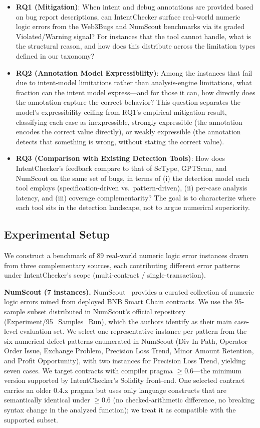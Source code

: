 \documentclass[pdflatex,sn-basic]{sn-jnl}%
\theoremstyle{thmstyleone}%
\theoremstyle{thmstyletwo}%
\theoremstyle{thmstylethree}%
\begin{document}
\begin{itemize}
    \item \textbf{RQ1 (Mitigation)}: When intent and debug annotations are provided based on bug report descriptions, can IntentChecker surface real-world numeric logic errors from the Web3Bugs and NumScout benchmarks via its graded Violated/Warning signal? For instances that the tool cannot handle, what is the structural reason, and how does this distribute across the limitation types defined in our taxonomy?
    \item \textbf{RQ2 (Annotation Model Expressibility)}: Among the instances that fail due to intent-model limitations rather than analysis-engine limitations, what fraction can the intent model express---and for those it can, how directly does the annotation capture the correct behavior? This question separates the model's expressibility ceiling from RQ1's empirical mitigation result, classifying each case as inexpressible, strongly expressible (the annotation encodes the correct value directly), or weakly expressible (the annotation detects that something is wrong, without stating the correct value).
    \item \textbf{RQ3 (Comparison with Existing Detection Tools)}: How does IntentChecker's feedback compare to that of ScType, GPTScan, and NumScout on the same set of bugs, in terms of (i) the detection model each tool employs (specification-driven vs.\ pattern-driven), (ii) per-case analysis latency, and (iii) coverage complementarity? The goal is to characterize where each tool sits in the detection landscape, not to argue numerical superiority.
\end{itemize}

\subsection{Experimental Setup}\label{sec:setup}

We construct a benchmark of 89 real-world numeric logic error instances drawn from three complementary sources, each contributing different error patterns under IntentChecker's scope (multi-contract / single-transaction).

\smallskip\noindent\textbf{NumScout (7 instances).}
NumScout~\citep{numscout} provides a curated collection of numeric logic errors mined from deployed BNB Smart Chain contracts.
We use the 95-sample subset distributed in NumScout's official repository (Experiment/95\_Samples\_Run), which the authors identify as their main case-level evaluation set.
We select one representative instance per pattern from the six numerical defect patterns enumerated in NumScout (Div In Path, Operator Order Issue, Exchange Problem, Precision Loss Trend, Minor Amount Retention, and Profit Opportunity), with two instances for Precision Loss Trend, yielding seven cases.
We target contracts with compiler pragma $\geq$0.6---the minimum version supported by IntentChecker's Solidity front-end.
One selected contract carries an older 0.4.x pragma but uses only language constructs that are semantically identical under $\geq$0.6 (no checked-arithmetic difference, no breaking syntax change in the analyzed function); we treat it as compatible with the supported subset.
\end{document}
